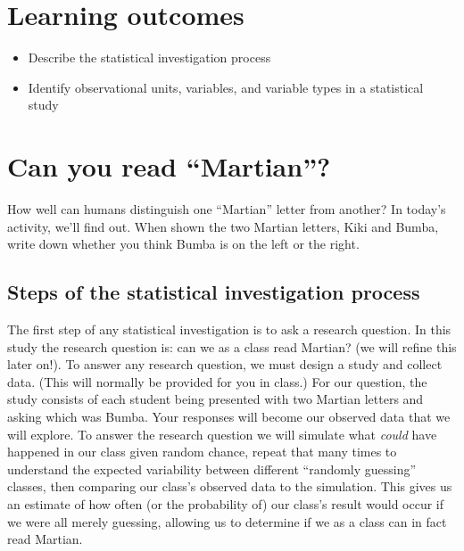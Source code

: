 \documentclass[
]{report}
\begin{document}
\hypertarget{learning-outcomes}{%
\section{Learning outcomes}\label{learning-outcomes}}

\begin{itemize}
\item
  Describe the statistical investigation process
\item
  Identify observational units, variables, and variable types in a statistical study
\end{itemize}

\hypertarget{can-you-read-martian}{%
\section{Can you read ``Martian''?}\label{can-you-read-martian}}

How well can humans distinguish one ``Martian'' letter from another? In today's activity, we'll find out. When shown the two Martian letters, Kiki and Bumba, write down whether you think Bumba is on the left or the right.

\vspace{0.2in}

\hypertarget{steps-of-the-statistical-investigation-process}{%
\subsection{Steps of the statistical investigation process}\label{steps-of-the-statistical-investigation-process}}

The first step of any statistical investigation is to ask a research question. In this study the research question is: can we as a class read Martian? (we will refine this later on!). To answer any research question, we must design a study and collect data. (This will normally be provided for you in class.) For our question, the study consists of each student being presented with two Martian letters and asking which was Bumba. Your responses will become our observed data that we will explore. To answer the research question we will simulate what \emph{could} have happened in our class given random chance, repeat that many times to understand the expected variability between different ``randomly guessing'' classes, then comparing our class's observed data to the simulation. This gives us an estimate of how often (or the probability of) our class's result would occur if we were all merely guessing, allowing us to determine if we as a class can in fact read Martian.
\end{document}
